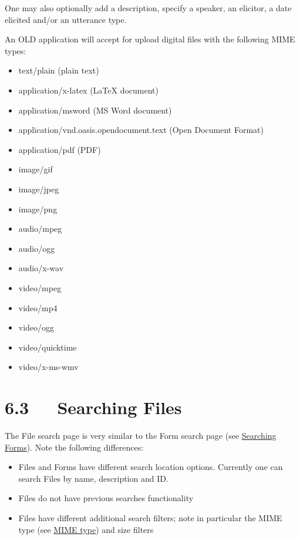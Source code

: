\documentclass[letterpaper,10pt,english]{sphinxmanual}
\begin{document}
One may also optionally add a description, specify a speaker, an elicitor, a
date elicited and/or an utterance type.

An OLD application will accept for upload digital files with the following MIME
types:
\begin{itemize}
\item {} 
text/plain (plain text)

\item {} 
application/x-latex (LaTeX document)

\item {} 
application/msword (MS Word document)

\item {} 
application/vnd.oasis.opendocument.text (Open Document Format)

\item {} 
application/pdf (PDF)

\item {} 
image/gif

\item {} 
image/jpeg

\item {} 
image/png

\item {} 
audio/mpeg

\item {} 
audio/ogg

\item {} 
audio/x-wav

\item {} 
video/mpeg

\item {} 
video/mp4

\item {} 
video/ogg

\item {} 
video/quicktime

\item {} 
video/x-ms-wmv

\end{itemize}


\section{6.3   Searching Files}
\label{user_guide:searching-files}
The File search page is very similar to the Form search page (see
{\hyperref[user_guide:searching-forms]{Searching Forms}}).  Note the following differences:
\begin{itemize}
\item {} 
Files and Forms have different search location options.  Currently one can
search Files by name, description and ID.

\item {} 
Files do not have previous searches functionality

\item {} 
Files have different additional search filters; note in particular the
MIME type (see {\hyperref[user_guide:mime-type]{MIME type}}) and size filters

\end{itemize}
\end{document}
